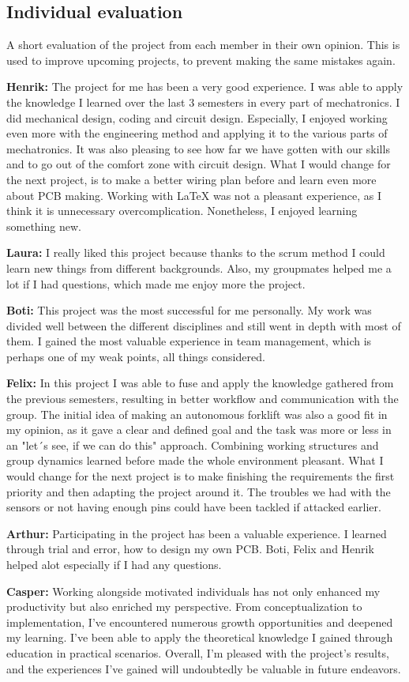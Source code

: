 \documentclass[../report.tex]{subfiles}
\begin{document}
\subsection{Individual evaluation}
A short evaluation of the project from each member in their own opinion. This is used to improve
upcoming projects, to prevent making the same mistakes again.

\textbf{Henrik:}
The project for me has been a very good experience. I was able to apply the knowledge
I learned over the last 3 semesters in every part of mechatronics. I did mechanical
design, coding and circuit design. Especially, I enjoyed working even more
with the engineering method and applying it to the various parts of mechatronics. 
It was also pleasing to see how far we have gotten with our skills and to go out of the comfort zone with circuit design. What I would change for the
next project, is to make a better wiring plan before and learn even more about PCB making.
Working with LaTeX was not a pleasant
experience, as I think it is unnecessary overcomplication. Nonetheless, I enjoyed learning something new.


\textbf{Laura:}
I really liked this project because thanks to the scrum method I could learn new things from different 
backgrounds. Also, my groupmates helped me a lot if I had questions, which made me enjoy more the project.

\textbf{Boti:}
This project was the most successful for me personally. My work was divided well between the different disciplines
and still went in depth with most of them. I gained the most valuable experience in team management, which is perhaps one of
my weak points, all things considered.

\textbf{Felix:}
In this project I was able to fuse and apply the knowledge gathered from the previous semesters, resulting in better 
workflow and communication with the group. The initial idea of making an autonomous forklift was also a good fit 
in my opinion, as it gave a clear and defined goal and the task was more or less in an "let´s see, if we can do this" 
approach. Combining working structures and group dynamics learned before made the whole environment pleasant.  What I would 
change for the next project is to make finishing the requirements the first priority and then adapting the project around it. 
The troubles we had with the sensors or not having enough pins could have been tackled if attacked earlier.



\textbf{Arthur:}
Participating in the project has been a valuable experience. I learned through trial and error, how to design my own PCB. 
Boti, Felix and Henrik helped alot especially if I had any questions. 


\textbf{Casper:}
Working alongside motivated individuals has not only enhanced my productivity
but also enriched my perspective.  From conceptualization to implementation,
I've encountered numerous growth opportunities and deepened my learning. I've
been able to apply the theoretical knowledge I gained through education in
practical scenarios. Overall, I'm pleased with the project's results, and the
experiences I've gained will undoubtedly be valuable in future endeavors.
\end{document}

